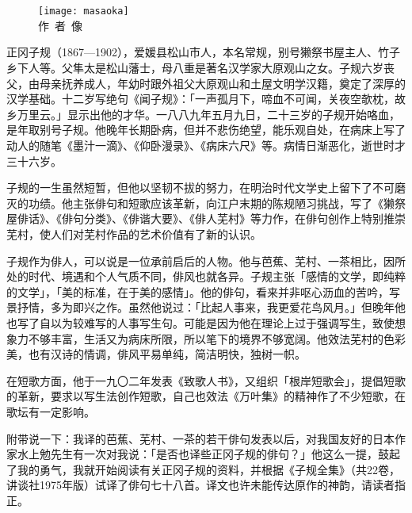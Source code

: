 
\chapter[{\FM 正岡子規}]{\FM {}}

\begin{center}
    \begin{figure}
        \centering
        \texttt{[image: masaoka]}\\[1em]
        \large{\FS 作~者~像}
    \end{figure}
\end{center}

\newpage
{\FS
    正冈子规（1867—1902），爱媛县松山市人，本名常规，别号獭祭书屋主人、竹子乡下人等。父隼太是松山藩士，母八重是著名汉学家大原观山之女。子规六岁丧父，由母亲抚养成人，年幼时跟外祖父大原观山和土屋文明学汉籍，奠定了深厚的汉学基础。十二岁写绝句《闻子规》：「一声孤月下，啼血不可闻，关夜空欹枕，故乡万里云。」显示出他的才华。一八八九年五月九日，二十三岁的子规开始咯血，是年取别号子规。他晚年长期卧病，但并不悲伤绝望，能乐观自处，在病床上写了动人的随笔《墨汁一滴》、《仰卧漫录》、《病床六尺》等。病情日渐恶化，逝世时才三十六岁。

    子规的一生虽然短暂，但他以坚韧不拔的努力，在明治时代文学史上留下了不可磨灭的功绩。他主张俳句和短歌应该革新，向江户末期的陈规陋习挑战，写了《獭祭屋俳话》、《俳句分类》、《俳谐大要》、《俳人芜村》等力作，在俳句创作上特别推崇芜村，使人们对芜村作品的艺术价值有了新的认识。

    子规作为俳人，可以说是一位承前启后的人物。他与芭蕉、芜村、一茶相比，因所处的时代、境遇和个人气质不同，俳风也就各异。子规主张「感情的文学，即纯粹的文学」，「美的标准，在于美的感情」。他的俳句，看来并非呕心沥血的苦吟，写景抒情，多为即兴之作。虽然他说过：「比起人事来，我更爱花鸟风月。」但晚年他也写了自以为较难写的人事写生句。可能是因为他在理论上过于强调写生，致使想象力不够丰富，生活又为病床所限，所以笔下的境界不够宽阔。他效法芜村的色彩美，也有汉诗的情调，俳风平易单纯，简洁明快，独树一帜。

    在短歌方面，他于一九〇二年发表《致歌人书》，又组织「根岸短歌会」，提倡短歌的革新，要求以写生法创作短歌，自己也效法《万叶集》的精神作了不少短歌，在歌坛有一定影响。

    附带说一下：我译的芭蕉、芜村、一茶的若干俳句发表以后，对我国友好的日本作家水上勉先生有一次对我说：「是否也译些正冈子规的俳句？」他这么一提，鼓起了我的勇气，我就开始阅读有关正冈子规的资料，并根据《子规全集》（共22卷，讲谈社1975年版）试译了俳句七十八首。译文也许未能传达原作的神韵，请读者指正。
}

